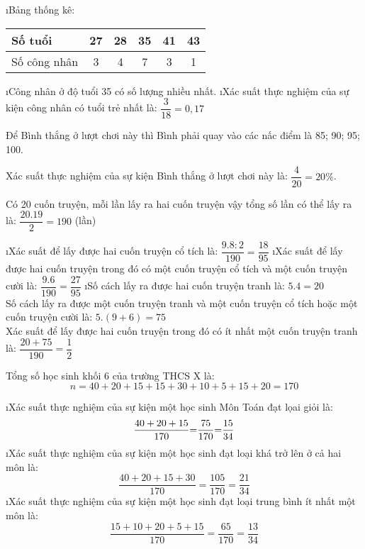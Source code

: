 \begin{Answer}{32}
		\begin{enumerate}[a),leftmargin=*]
			\i Bảng thống kê:
			\begin{center}
				\begin{tabular}{|l|c|c|c|c|c|}
					\hline
					Số tuổi & 27&28&35&41&43\\
					\hline	
					Số công nhân & 3&4&7&3&1\\
					\hline	
				\end{tabular}
			\end{center}
			\i	Công nhân ở độ tuổi  35 có số lượng nhiều nhất.
			\i	Xác suất thực nghiệm của sự kiện công nhân có tuổi trẻ nhất là: $\dfrac{3}{18} = 0,17$
		\end{enumerate}
	
\end{Answer}
\begin{Answer}{33}
		Để Bình thắng ở lượt chơi này thì Bình phải quay vào các nấc điểm là  85;  90; 95; 100.
		
		Xác suất thực nghiệm của sự kiện Bình thắng ở lượt chơi này là:  $\dfrac{4}{{20}} = 20\% $.
	
\end{Answer}
\begin{Answer}{34}
		Có 20 cuốn truyện, mỗi lần lấy ra hai cuốn truyện vậy tổng số lần có thể lấy ra là:  $\dfrac{20.19}{2}= 190$ (lần)
		\begin{enumerate}[a),leftmargin=*]
			\i Xác suất để lấy được hai cuốn truyện cổ tích là: $\dfrac{{9.8:2}}{{190}} = \dfrac{{18}}{{95}}$
			\i Xác suất để lấy được hai cuốn truyện trong đó có một cuốn truyện cổ tích và một cuốn truyện cười là:  $\dfrac{{9.6}}{{190}} = \dfrac{{27}}{{95}}$
			\i Số cách lấy ra được hai cuốn truyện tranh là:  $5.4 = 20$\\
			Số cách lấy ra được một cuốn truyện tranh và một cuốn truyện cổ tích hoặc một cuốn truyện cười là:  $5.\left( {9 + 6} \right) = 75$\\
			Xác suất để lấy được hai cuốn truyện trong đó có ít nhất một cuốn truyện tranh là:  $\dfrac{{20 + 75}}{{190}} = \dfrac{1}{2}$
		\end{enumerate}
	
\end{Answer}
\begin{Answer}{35}
		Tổng số học sinh khối 6 của trường THCS X là:\[n  =  40  +  20  + 15  + 15  +  30  +  10  +  5  +  15  +  20  =  170\]
		\begin{enumerate}[a),leftmargin=*]
			\i Xác suất thực nghiệm của sự kiện một học sinh Môn Toán đạt lọai giỏi là:
			\[\dfrac{{{\rm{40 + 20 + 15}}}}{{{\rm{170}}}}{\rm{ = }}\dfrac{{{\rm{75}}}}{{{\rm{170}}}}{\rm{ = }}\dfrac{{{\rm{15}}}}{{{\rm{34}}}}\]
			\i Xác suất thực nghiệm cůa sự kiện một học sinh đạt loại khá trở lên ở cả hai môn là:
			\[\dfrac{{40 + 20 + 15 + 30}}{{170}} = \dfrac{{105}}{{170}} = \dfrac{{21}}{{34}}\]
			\i Xác suất thực nghiệm cůa sự kiện một học sinh đạt loại trung bình ít nhất một môn là:
			\[\dfrac{{15 + 10 + 20 + 5 + 15}}{{170}} = \dfrac{{65}}{{170}} = \dfrac{{13}}{{34}}\]
		\end{enumerate}
	
\end{Answer}

